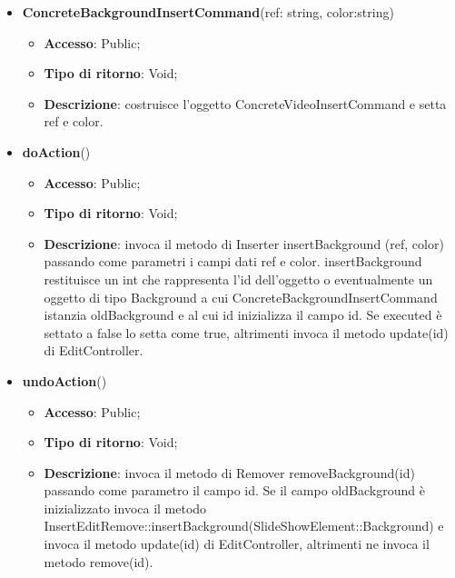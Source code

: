 {{{	
	\begin{itemize}
		\item \textbf{ConcreteBackgroundInsertCommand}(ref: string, color:string)
		\begin{itemize}
			\item \textbf{Accesso}: Public;
			\item \textbf{Tipo di ritorno}: Void;
			\item \textbf{Descrizione}: costruisce l’oggetto ConcreteVideoInsertCommand e setta ref e color.
		\end{itemize}
		\item \textbf{doAction}()
		\begin{itemize}
			\item \textbf{Accesso}: Public;
			\item \textbf{Tipo di ritorno}: Void;
			\item \textbf{Descrizione}: invoca il metodo di Inserter insertBackground (ref, color) passando come parametri i  campi dati ref e color. insertBackground restituisce un int che rappresenta l’id dell’oggetto o eventualmente un oggetto di tipo Background a cui ConcreteBackgroundInsertCommand istanzia oldBackground e al cui id inizializza il campo id. Se executed è settato a false lo setta come true, altrimenti invoca il metodo update(id) di EditController.
		\end{itemize}
		\item \textbf{undoAction}()
		\begin{itemize}
			\item \textbf{Accesso}: Public;
			\item \textbf{Tipo di ritorno}: Void;
			\item \textbf{Descrizione}: invoca il metodo di Remover removeBackground(id) passando come parametro il campo id. Se il campo oldBackground è inizializzato invoca il metodo InsertEditRemove::insertBackground(SlideShowElement::Background) e invoca il metodo update(id) di EditController, altrimenti ne invoca il metodo remove(id).
		\end{itemize}
	\end{itemize}
	}
}}
